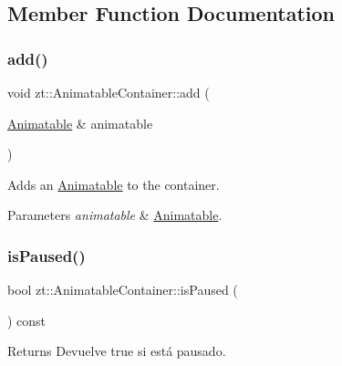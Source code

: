 \subsection{Member Function Documentation}
\mbox{\label{classzt_1_1_animatable_container_a4288e8efa0335f0f34b678a9f5b92219}} 
\subsubsection{\texorpdfstring{add()}{add()}}
{\footnotesize\ttfamily void zt\+::\+Animatable\+Container\+::add (\begin{DoxyParamCaption}\item[{\hyperlink{classzt_1_1_animatable}{Animatable} \&}]{animatable }\end{DoxyParamCaption})}



Adds an \hyperlink{classzt_1_1_animatable}{Animatable} to the container. 


\begin{DoxyParams}{Parameters}
{\em animatable} & \hyperlink{classzt_1_1_animatable}{Animatable}. \\
\hline
\end{DoxyParams}
\mbox{\label{classzt_1_1_animatable_container_ad9101ffe27f3615e72bc66b04061b737}} 
\subsubsection{\texorpdfstring{is\+Paused()}{isPaused()}}
{\footnotesize\ttfamily bool zt\+::\+Animatable\+Container\+::is\+Paused (\begin{DoxyParamCaption}{ }\end{DoxyParamCaption}) const}

\begin{DoxyReturn}{Returns}
Devuelve true si está pausado. 
\end{DoxyReturn}
\mbox{\label{classzt_1_1_animatable_container_a7c05633b4d68f39617f8ccc9bd752beb}} 
